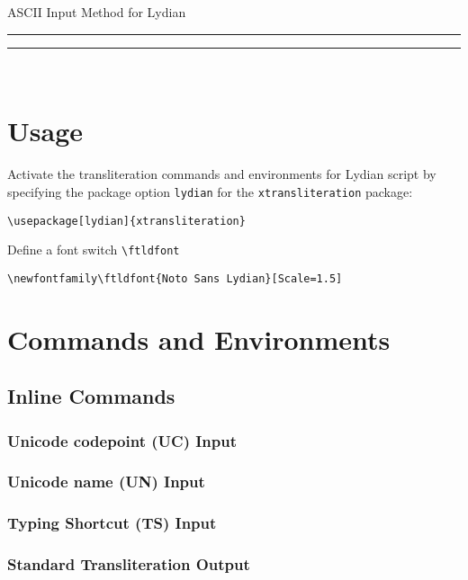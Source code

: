 \documentclass{article}
\newcommand\bqq[1]{\begin{quotation}#1\end{quotation}}
\begin{document}
\begin{center}
{\ttfamily ASCII Input Method for Lydian}

\rule{0.4\textwidth}{0.2pt}
\end{center}

\tableofcontents

\bigskip
\hfill\rule{0.4\textwidth}{0.2pt}\hfill\ 

\section{Usage}
Activate the transliteration commands and environments for Lydian script by specifying the package option \texttt{lydian} for the \texttt{xtransliteration} package:

\begin{center}
\verb|\usepackage[lydian]{xtransliteration}|
\end{center}

Define a font switch \texttt{\textbackslash ftldfont}

\begin{center}
\verb|\newfontfamily\ftldfont{Noto Sans Lydian}[Scale=1.5]|
\end{center}

\section{Commands and Environments}

\subsection{Inline Commands}
\subsubsection{Unicode codepoint (UC) Input}
\bqq{}

\subsubsection{Unicode name (UN) Input}
\bqq{}

\subsubsection{Typing Shortcut (TS) Input}
\bqq{}

\subsubsection{Standard Transliteration Output}
\bqq{}
\end{document}
